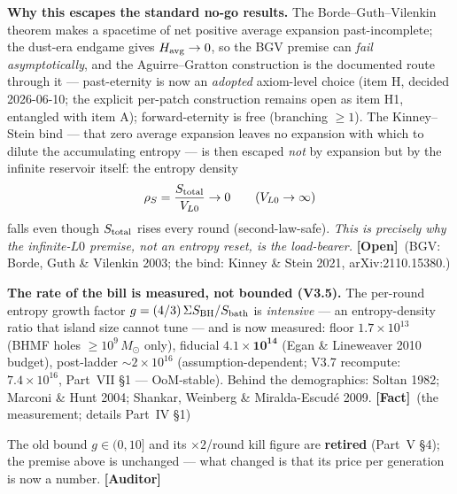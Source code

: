 \documentclass[11pt]{article}
\newcommand{\Fact}{\textbf{\textcolor{green!45!black}{[Fact]}}}
\newcommand{\Open}{\textbf{\textcolor{gray!10!black}{[Open]}}}
\newcommand{\Auditor}{\textbf{\textcolor{teal!55!black}{[Auditor]}}}
\newcommand{\msun}{M_\odot}
\begin{document}
\textbf{Why this escapes the standard no-go results.} The Borde--Guth--Vilenkin theorem makes a spacetime of net positive average expansion past-incomplete; the dust-era endgame gives $H_{\rm avg}\to0$, so the BGV premise can \emph{fail asymptotically}, and the Aguirre--Gratton construction is the documented route through it --- past-eternity is now an \emph{adopted} axiom-level choice (item H, decided 2026-06-10; the explicit per-patch construction remains open as item H1, entangled with item A); forward-eternity is free (branching $\ge1$). The Kinney--Stein bind --- that zero average expansion leaves no expansion with which to dilute the accumulating entropy --- is then escaped \emph{not} by expansion but by the infinite reservoir itself: the entropy density
\begin{equation}
\rho_S=\frac{S_{\rm total}}{V_{L0}}\to 0\qquad(V_{L0}\to\infty)
\end{equation}
falls even though $S_{\rm total}$ rises every round (second-law-safe). \emph{This is precisely why the infinite-$L0$ premise, not an entropy reset, is the load-bearer.} \Open\ (BGV: Borde, Guth \& Vilenkin 2003; the bind: Kinney \& Stein 2021, arXiv:2110.15380.)

\textbf{The rate of the bill is measured, not bounded (V3.5).} The per-round entropy growth factor $g=(4/3)\,\Sigma S_{\rm BH}/S_{\rm bath}$ is \emph{intensive} --- an entropy-density ratio that island size cannot tune --- and is now measured: floor $1.7\times10^{13}$ (BHMF holes $\ge10^9\,\msun$ only), fiducial $\mathbf{4.1\times10^{14}}$ (Egan \& Lineweaver 2010 budget), post-ladder $\sim\!2\times10^{16}$ (assumption-dependent; V3.7 recompute: $7.4\times10^{16}$, Part~VII \S1 --- OoM-stable). Behind the demographics: Soltan 1982; Marconi \& Hunt 2004; Shankar, Weinberg \& Miralda-Escud\'e 2009. \Fact\ (the measurement; details Part~IV \S1)
\begin{center}\end{center}
The old bound $g\in(0,10]$ and its $\times2$/round kill figure are \textbf{retired} (Part~V \S4); the premise above is unchanged --- what changed is that its price per generation is now a number. \Auditor

\end{document}
